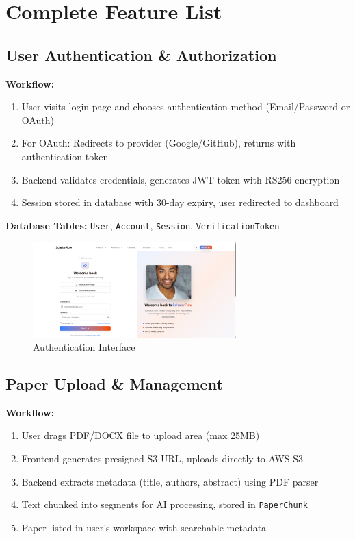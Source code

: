 \section{Complete Feature List}
\label{sec:features}

\subsection{User Authentication \& Authorization}

\textbf{Workflow:}
\begin{enumerate}[leftmargin=*,topsep=3pt,itemsep=2pt]
    \item User visits login page and chooses authentication method (Email/Password or OAuth)
    \item For OAuth: Redirects to provider (Google/GitHub), returns with authentication token
    \item Backend validates credentials, generates JWT token with RS256 encryption
    \item Session stored in database with 30-day expiry, user redirected to dashboard
\end{enumerate}

\textbf{Database Tables:} \texttt{User}, \texttt{Account}, \texttt{Session}, \texttt{VerificationToken}

\begin{figure}[H]
\centering
\includegraphics[width=0.7\textwidth]{images/screenshots/sign_in.png}
\caption{Authentication Interface}
\label{fig:auth}
\end{figure}

\subsection{Paper Upload \& Management}

\textbf{Workflow:}
\begin{enumerate}[leftmargin=*,topsep=3pt,itemsep=2pt]
    \item User drags PDF/DOCX file to upload area (max 25MB)
    \item Frontend generates presigned S3 URL, uploads directly to AWS S3
    \item Backend extracts metadata (title, authors, abstract) using PDF parser
    \item Text chunked into segments for AI processing, stored in \texttt{PaperChunk}
    \item Paper listed in user's workspace with searchable metadata
\end{enumerate}

